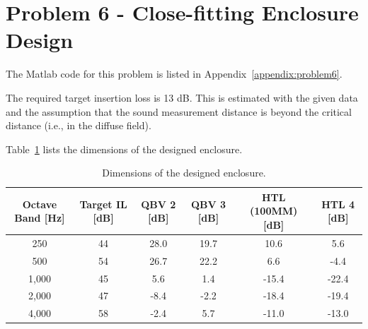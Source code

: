 {{\newpage
\section*{Problem 6 - Close-fitting Enclosure Design}

%


The Matlab code for this problem is listed in Appendix~\ref{appendix:problem6}.

\vspace{0.25cm}
The required target insertion loss is 13 dB.  This is estimated with the given data and the assumption that the sound measurement distance is beyond the critical distance (i.e., in the diffuse field).


\vspace{0.25cm}
Table~\ref{table:Q6enclosureDesign} lists the dimensions of the designed enclosure.

\vspace{0.25cm}
\setlength{\abovecaptionskip}{0pt}
\vspace{0.1cm}
{\renewcommand{\arraystretch}{1.25}
\begin{table}[h!]
    \begin{center}
        \small
        \begin{tabular}{ | c | c | c | c | c | c |}
            \hline
            \textbf{Octave Band [Hz]}  &  \textbf{Target IL [dB]}  &  \textbf{QBV 2 [dB]}  &  \textbf{QBV 3 [dB]}  &  \textbf{HTL (100MM) [dB]}  &  \textbf{HTL 4 [dB]}  \\
            \hline
            250    &  44  &  28.0  &  19.7  &  10.6   &  5.6  \\
            \rowcolor{Gray}
            500    &  54  &  26.7  &  22.2  &  6.6    &  -4.4  \\
            1,000  &  45  &  5.6   &  1.4   &  -15.4  &  -22.4  \\
            \rowcolor{Gray}
            2,000  &  47  &  -8.4  &  -2.2  &  -18.4  &  -19.4  \\
            4,000  &  58  &  -2.4  &  5.7   &  -11.0  &  -13.0  \\
            \hline
        \end{tabular}
    \end{center}
    \caption{Dimensions of the designed enclosure.}
    \label{table:Q6enclosureDesign}
\end{table}


}}}
